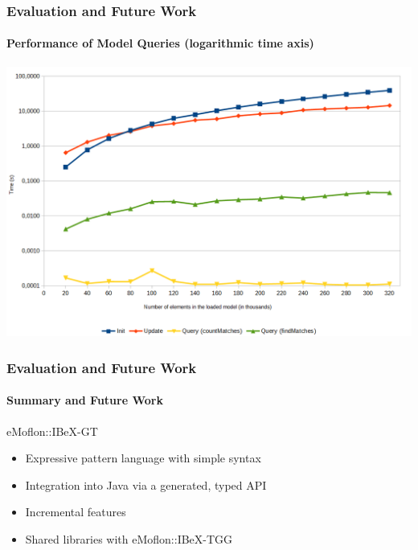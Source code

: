 	\begin{frame}
		\frametitle{Evaluation and Future Work}
		\framesubtitle{Performance of Model Queries (logarithmic time axis)}
		\begin{center}
			\includegraphics[height=.75\textheight]{../common/figures/evaluation-runtime2-logarithmic}
		\end{center}
	\end{frame}
	\begin{frame}
		\frametitle{Evaluation and Future Work}
		\framesubtitle{Summary and Future Work}
		\begin{block}{eMoflon::IBeX-GT}
			\begin{itemize}
				\item Expressive pattern language with simple syntax
				\item Integration into Java via a generated, typed API
				\item Incremental features
				\item Shared libraries with eMoflon::IBeX-TGG
			\end{itemize}
		\end{block}

	\end{frame}
